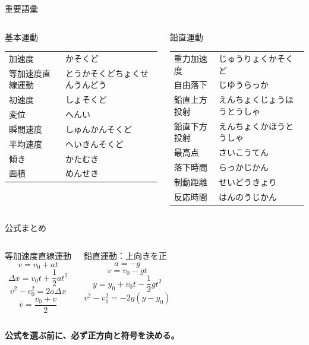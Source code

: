 \documentclass[notheorems,aspectratio=169]{beamer}
\newcommand{\key}[1]{\textbf{\color{ChinaRed}#1}}
\begin{document}
\begin{frame}{重要語彙}
  \scriptsize
  \begin{columns}[T,onlytextwidth]
    \begin{block}{基本運動}
      \begin{tabular}{ll}
        加速度 & かそくど\\
        等加速度直線運動 & とうかそくどちょくせんうんどう\\
        初速度 & しょそくど\\
        変位 & へんい\\
        瞬間速度 & しゅんかんそくど\\
        平均速度 & へいきんそくど\\
        傾き & かたむき\\
        面積 & めんせき\\
      \end{tabular}
    \end{block}
    \begin{alertblock}{鉛直運動}
      \begin{tabular}{ll}
        重力加速度 & じゅうりょくかそくど\\
        自由落下 & じゆうらっか\\
        鉛直上方投射 & えんちょくじょうほうとうしゃ\\
        鉛直下方投射 & えんちょくかほうとうしゃ\\
        最高点 & さいこうてん\\
        落下時間 & らっかじかん\\
        制動距離 & せいどうきょり\\
        反応時間 & はんのうじかん\\
      \end{tabular}
    \end{alertblock}
  \end{columns}
\end{frame}

\begin{frame}{公式まとめ}
  \begin{columns}[T,onlytextwidth]
    \begin{block}{等加速度直線運動}
      \[
        v=v_0+at
      \]
      \[
        \Delta x=v_0t+\frac12at^2
      \]
      \[
        v^2-v_0^2=2a\Delta x
      \]
      \[
        \bar v=\frac{v_0+v}{2}
      \]
    \end{block}
    \begin{alertblock}{鉛直運動：上向きを正}
      \[
        a=-g
      \]
      \[
        v=v_0-gt
      \]
      \[
        y=y_0+v_0t-\frac12gt^2
      \]
      \[
        v^2-v_0^2=-2g(y-y_0)
      \]
    \end{alertblock}
  \end{columns}
  \vfill
  \centering
  \key{公式を選ぶ前に、必ず正方向と符号を決める。}
\end{frame}
\end{document}
